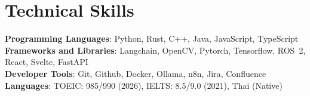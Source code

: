 \documentclass[letterpaper,11pt]{article}
\begin{document}
%
\section{Technical Skills}
 \begin{itemize}[leftmargin=0.15in, label={}]
    \small{\item{
     \textbf{Programming Languages}{: Python, Rust, C++, Java, JavaScript, TypeScript} \\
     \textbf{Frameworks and Libraries}{: Langchain, OpenCV, Pytorch, Tensorflow, ROS~2, React, Svelte, FastAPI} \\
     \textbf{Developer Tools}{: Git, Github, Docker, Ollama, n8n, Jira, Confluence} \\
     \textbf{Languages}{: TOEIC: 985/990 (2026), IELTS: 8.5/9.0 (2021), Thai (Native) }
    }}
 \end{itemize}


\end{document}
